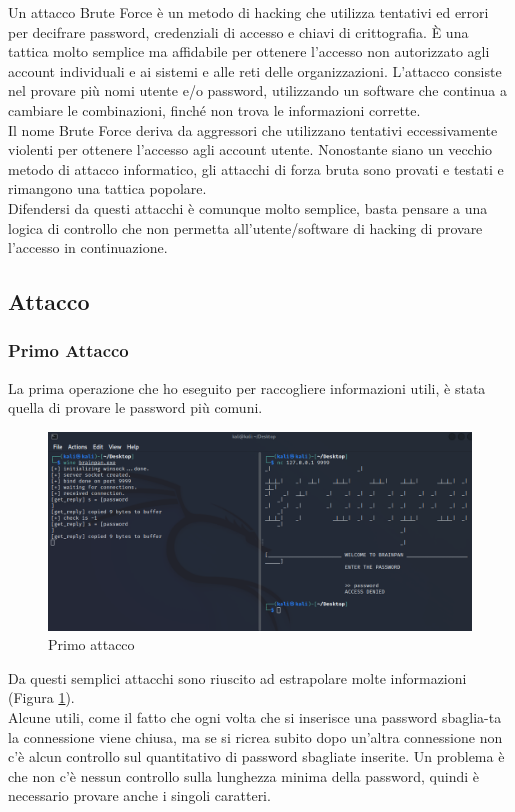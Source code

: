 \documentclass[12pt,letterpaper]{article} %
\begin{document}
Un attacco Brute Force è un metodo di hacking che utilizza tentativi ed errori per decifrare password, credenziali di accesso e chiavi di crittografia. È una tattica molto semplice ma affidabile per ottenere l'accesso non autorizzato agli account individuali e ai sistemi e alle reti delle organizzazioni. L'attacco consiste nel provare più nomi utente e/o password, utilizzando un software che continua a cambiare le combinazioni, finché non trova le informazioni corrette.\\
Il nome Brute Force deriva da aggressori che utilizzano tentativi eccessivamente violenti per ottenere l'accesso agli account utente. Nonostante siano un vecchio metodo di attacco informatico, gli attacchi di forza bruta sono provati e testati e rimangono una tattica popolare.\\
Difendersi da questi attacchi è comunque molto semplice, basta pensare a una logica di controllo che non permetta all'utente/software di hacking di provare l'accesso in continuazione.

\subsection{Attacco}
\subsubsection{Primo Attacco}
La prima operazione che ho eseguito per raccogliere informazioni utili, è stata quella di provare le password più comuni.

\begin{figure}[h!]
  \includegraphics[width=\textwidth]{accessDenied.png}
  \caption{Primo attacco}
  \label{fig:accDen}
\end{figure}

\noindent Da questi semplici attacchi sono riuscito ad estrapolare molte informazioni (Figura \ref{fig:accDen}).\\
Alcune utili, come il fatto che ogni volta che si inserisce una password sbaglia-ta la connessione viene chiusa, ma se si ricrea subito dopo un'altra connessione non c'è alcun controllo sul quantitativo di password sbagliate inserite. Un problema è che non c'è nessun controllo sulla lunghezza minima della password, quindi è necessario provare anche i singoli caratteri.
\end{document}
